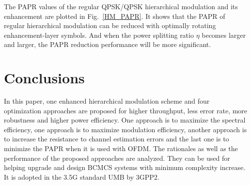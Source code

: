 \documentclass[conference]{IEEEtran}
\begin{document}
The PAPR values of the regular QPSK/QPSK hierarchical modulation
and its enhancement are plotted in Fig.~\ref{HM_PAPR}. It shows
that the PAPR of regular hierarchical modulation can be reduced
with optimally rotating enhancement-layer symbols. And when the
power splitting ratio $\eta$ becomes larger and larger, the PAPR
reduction performance will be more significant.
\begin{figure} 
\end{figure}


\section{Conclusions}
In this paper, one enhanced hierarchical modulation scheme and
four optimization approaches are proposed for higher throughput,
less error rate, more robustness and higher power efficiency. One
approach is to maximize the spectral efficiency, one approach is
to maximize modulation efficiency, another approach is to increase
the resistance to channel estimation errors and the last one is to
minimize the PAPR when it is used with OFDM. The rationales as
well as the performance of the proposed approaches are analyzed.
They can be used for helping upgrade and design BCMCS systems with
minimum complexity increase. It is adopted in the 3.5G standard
UMB by 3GPP2. \small


\end{document}
